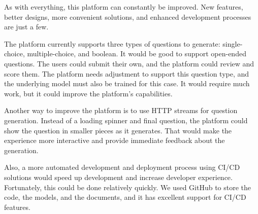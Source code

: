 As with everything, this platform can constantly be improved. New features, better designs, more convenient solutions, and enhanced development processes are just a few.

The platform currently supports three types of questions to generate: single-choice, multiple-choice, and boolean. It would be good to support open-ended questions. The users could submit their own, and the platform could review and score them. The platform needs adjustment to support this question type, and the underlying model must also be trained for this case. It would require much work, but it could improve the platform's capabilities.

Another way to improve the platform is to use HTTP streams for question generation. Instead of a loading spinner and final question, the platform could show the question in smaller pieces as it generates. That would make the experience more interactive and provide immediate feedback about the generation.

Also, a more automated development and deployment process using CI/CD solutions would speed up development and increase developer experience. Fortunately, this could be done relatively quickly. We used GitHub to store the code, the models, and the documents, and it has excellent support for CI/CD features.